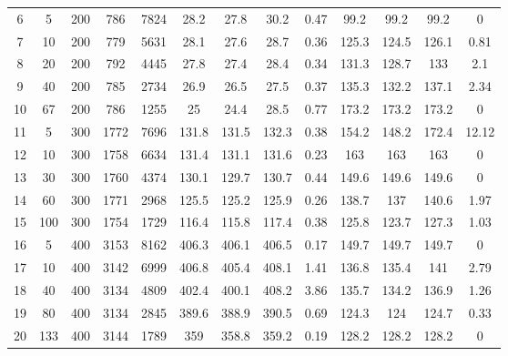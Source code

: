 \documentclass[11pt]{article}
\begin{document}
\begin{landscape}
\begin{longtable}[c]{ccccc|cccc|cccc}
			6  & 5   & 200 & 786  & 7824 & 28.2  & 27.8  & 30.2  & 0.47 & 99.2  & 99.2  & 99.2  & 0     \\
			7  & 10  & 200 & 779  & 5631 & 28.1  & 27.6  & 28.7  & 0.36 & 125.3 & 124.5 & 126.1 & 0.81  \\
			8  & 20  & 200 & 792  & 4445 & 27.8  & 27.4  & 28.4  & 0.34 & 131.3 & 128.7 & 133   & 2.1   \\
			9  & 40  & 200 & 785  & 2734 & 26.9  & 26.5  & 27.5  & 0.37 & 135.3 & 132.2 & 137.1 & 2.34  \\
			10 & 67  & 200 & 786  & 1255 & 25    & 24.4  & 28.5  & 0.77 & 173.2 & 173.2 & 173.2 & 0     \\
			\rowcolor[HTML]{EFEFEF} 
			11 & 5   & 300 & 1772 & 7696 & 131.8 & 131.5 & 132.3 & 0.38 & 154.2 & 148.2 & 172.4 & 12.12 \\
			\rowcolor[HTML]{EFEFEF} 
			12 & 10  & 300 & 1758 & 6634 & 131.4 & 131.1 & 131.6 & 0.23 & 163   & 163   & 163   & 0     \\
			\rowcolor[HTML]{EFEFEF} 
			13 & 30  & 300 & 1760 & 4374 & 130.1 & 129.7 & 130.7 & 0.44 & 149.6 & 149.6 & 149.6 & 0     \\
			\rowcolor[HTML]{EFEFEF} 
			14 & 60  & 300 & 1771 & 2968 & 125.5 & 125.2 & 125.9 & 0.26 & 138.7 & 137   & 140.6 & 1.97  \\
			\rowcolor[HTML]{EFEFEF} 
			15 & 100 & 300 & 1754 & 1729 & 116.4 & 115.8 & 117.4 & 0.38 & 125.8 & 123.7 & 127.3 & 1.03  \\
			16 & 5   & 400 & 3153 & 8162 & 406.3 & 406.1 & 406.5 & 0.17 & 149.7 & 149.7 & 149.7 & 0     \\
			17 & 10  & 400 & 3142 & 6999 & 406.8 & 405.4 & 408.1 & 1.41 & 136.8 & 135.4 & 141   & 2.79  \\
			18 & 40  & 400 & 3134 & 4809 & 402.4 & 400.1 & 408.2 & 3.86 & 135.7 & 134.2 & 136.9 & 1.26  \\
			19 & 80  & 400 & 3134 & 2845 & 389.6 & 388.9 & 390.5 & 0.69 & 124.3 & 124   & 124.7 & 0.33  \\
			20 & 133 & 400 & 3144 & 1789 & 359   & 358.8 & 359.2 & 0.19 & 128.2 & 128.2 & 128.2 & 0    
	\end{longtable}
\end{landscape}
\end{document}
